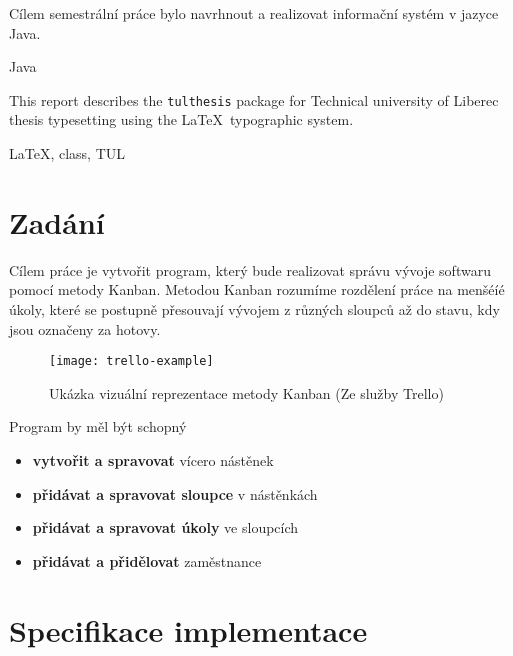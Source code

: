 \documentclass[FM,DP]{tulthesis}
\begin{document}

\begin{abstractCZ}
Cílem semestrální práce bylo navrhnout a realizovat informační systém v jazyce Java.
\end{abstractCZ}

\begin{keywordsCZ}
Java
\end{keywordsCZ}

\vspace{2cm}

\begin{abstractEN}
This report describes the \texttt{tulthesis} package for Technical university of
Liberec thesis typesetting using the \LaTeX\ typographic system.
\end{abstractEN}

\begin{keywordsEN}
\LaTeX, class, TUL
\end{keywordsEN}

\tableofcontents

\chapter{Zadání}
Cílem práce je vytvořit program, který bude realizovat správu vývoje softwaru pomocí metody Kanban. Metodou Kanban rozumíme rozdělení práce na menšéíé úkoly, které se postupně přesouvají vývojem z různých sloupců až do stavu, kdy jsou označeny za hotovy.

\begin{figure}[H]
	\centering
	\texttt{[image: trello-example]}
	\caption{Ukázka vizuální reprezentace metody Kanban (Ze služby Trello)}
\end{figure}

Program by měl být schopný
\begin{itemize}
	\item \textbf{vytvořit a spravovat} vícero nástěnek
	\item \textbf{přidávat a spravovat sloupce} v nástěnkách
	\item \textbf{přidávat a spravovat úkoly} ve sloupcích
	\item \textbf{přidávat a přidělovat} zaměstnance
\end{itemize}

\chapter{Specifikace implementace}
\end{document}
